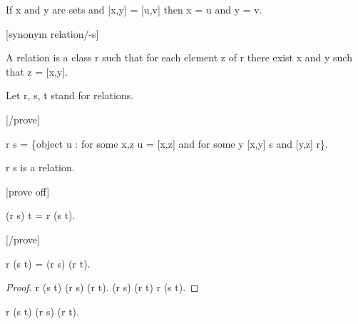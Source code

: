 \documentclass[a4paper,draft]{amsproc}
\begin{document}
\begin{forthel}
\begin{theorem}[55]
If x and y are sets and [x,y] = [u,v] then
x = u and y = v.
\end{theorem}


[synonym relation/-s]

\begin{definition}[56] 
A relation is a class r such that for each element z of r there exist x and y such that z = [x,y].
\end{definition}

Let r, s, t stand for relations.

[/prove]
\begin{definition}[57]
r \circ s = \{object u : for some x,z u = [x,z] and for some y [x,y] \in s and [y,z] \in r\}.
\end{definition}

\begin{lemma}
r \circ s is a relation.
\end{lemma}

[prove off]
\begin{theorem}[58]
(r \circ s) \circ t = r \circ (s \circ t).
\end{theorem}
[/prove]

\begin{theorem}[59a]
r \circ (s \cup t) = (r \circ s) \cup (r \circ t).
\end{theorem}
\begin{proof}
r \circ (s \cup t) \subset (r \circ s) \cup (r \circ t).
(r \circ s) \cup (r \circ t) \subset r \circ (s \cup t).
\end{proof}

\begin{theorem}[59b]
r \circ (s \cap t) \subset (r \circ s) \cap (r \circ t).
\end{theorem}


\end{forthel}
\end{document}
